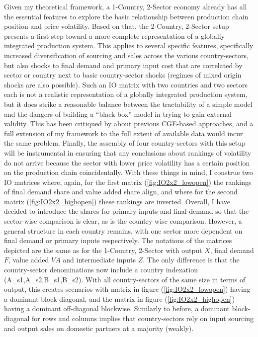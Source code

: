 Given my theoretical framework, a 1-Country, 2-Sector economy already has all the essential features to explore the basic relationship 
between production chain position and price volatility. Based on that, the 2-Country, 2-Sector setup presents a first step toward a more 
complete representation of a globally integrated production system. This applies to several specific features, specifically increased 
diversification of sourcing and sales across the various country-sectors, but also shocks to final demand and primary input cost that 
are correlated by sector or country next to basic country-sector shocks (regimes of mixed origin shocks are also possible). Such an IO 
matrix with two countries and two sectors each is not a realistic representation of a globally integrated production system, but it does 
strike a reasonable balance between the tractability of a simple model and the dangers of building a ``black box'' model in trying to 
gain external validity. This has been critiqued by \textcite{caliendo2015EstimatesTradeWelfare} about previous CGE-based approaches, 
and a full extension of my framework to the full extent of available data would incur the same problem. Finally, the assembly of four 
country-sectors with this setup will be instrumental in ensuring that any conclusions about rankings of volatility do not arrive because 
the sector with lower price volatility has a certain position on the production chain coincidentally. With these things in mind, I construe
two IO matrices where, again, for the first matrix (\ref{fig:IO2x2_lowopen}) the rankings of final demand share and value added share 
align, and where for the second matrix (\ref{fig:IO2x2_highopen}) these rankings are inverted. Overall, I have decided to introduce 
the shares for primary inputs and final demand so that the sector-wise comparison is clear, as is the country-wise comparison. 
However, a general structure in each country remains, with one sector more dependent on final demand or primary inputs respectively.
The notations of the matrices depicted 
are the same as for the 1-Country, 2-Sector with output $X$, final demand $F$, value added $VA$ and intermediate inputs $Z$. The only 
difference is that the country-sector denominations now include a country indexation (A\_s1,A\_s2,B\_s1,B\_s2). With all country-sectors 
of the same size in terms of output, this creates scenarios with matrix in figure (\ref{fig:IO2x2_lowopen}) having a dominant block-diagonal,
and the matrix in figure (\ref{fig:IO2x2_highopen}) having a dominant off-diagonal blockwise. Similarly to before, a dominant block-diagonal
for rows and columns implies that country-sectors rely on input sourcing and output sales on domestic partners at a majority (weakly).

